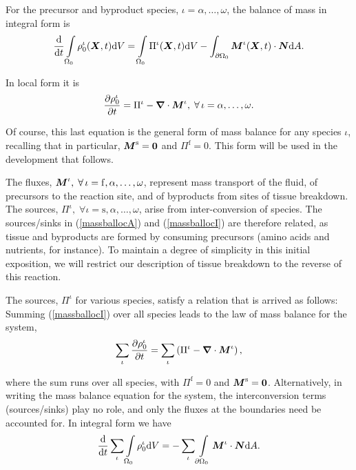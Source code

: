 For the precursor and byproduct species,
$\iota=\alpha,\dots,\omega$, the balance of mass in integral form
is
\begin{equation}
\frac{\mathrm{d}}{\mathrm{d}t} \int\limits_{\Omega_0} \rho_0^\iota
(\mbox{\boldmath$ X$},t)\mathrm{d}V = \int\limits_{\Omega_0} \Pi^\iota
(\mbox{\boldmath$ X$},t)\mathrm{d}V
-\int_{\partial\Omega_0}\mbox{\boldmath$ M$}^\iota(\mbox{\boldmath$ X$},t)\cdot\mbox{\boldmath$ N$} \mathrm{d}A.
\label{massbalintI}
\end{equation}

\noindent In local form it is
\begin{equation}
\frac{\partial\rho_0^\iota}{\partial t} = \Pi^\iota -
\mbox{\boldmath$\nabla$}\cdot\mbox{\boldmath$ M$}^\iota,\;\forall\,\iota=\alpha,\dots,\omega.
\label{massballocI}
\end{equation}

\noindent Of course, this last equation is the general form of
mass balance for any species $\iota$, recalling that in
particular, $\mbox{\boldmath$ M$}^\mathrm{s} = {\bf 0}$ and $\Pi^\mathrm{f} = 0$.
This form will be used in the development that follows.

The fluxes,
$\mbox{\boldmath$ M$}^\iota,\;\forall\,\iota=\mathrm{f},\alpha,\dots,\omega$,
represent mass transport of the fluid, of precursors to the
reaction site, and of byproducts from sites of tissue breakdown.
The sources,
$\Pi^\iota,\;\forall\iota=\mathrm{s},\alpha,\dots,\omega$, arise
from inter-conversion of species. The sources/sinks in
(\ref{massballocA}) and (\ref{massballocI}) are therefore related,
as tissue and byproducts are formed by consuming precursors (amino
acids and nutrients, for instance). To maintain a degree of
simplicity in this initial exposition, we will restrict our
description of tissue breakdown to the reverse of this reaction.

The sources, $\Pi^\iota$ for various species, satisfy a relation
that is arrived as follows: Summing (\ref{massballocI}) over all
species leads to the law of mass balance for the system,
\begin{equation}
\sum\limits_\iota\frac{\partial\rho_0^\iota}{\partial t} =
\sum\limits_\iota\left(\Pi^\iota - \mbox{\boldmath$\nabla$}\cdot\mbox{\boldmath$ M$}^\iota\right),
\label{massballocItot}
\end{equation}

\noindent where the sum runs over all species, with
$\Pi^\mathrm{f} = 0$ and $\mbox{\boldmath$ M$}^\mathrm{s} = {\bf 0}$. Alternatively,
in writing the mass balance equation for the system, the
interconversion terms (sources/sinks) play no role, and only the
fluxes at the boundaries need be accounted for. In integral form
we have
\begin{displaymath}
\frac{\mathrm{d}}{\mathrm{d}t}\sum\limits_\iota\int\limits_{\Omega_0}\rho_0^\iota
\mathrm{d}V =
-\sum\limits_\iota\int\limits_{\partial\Omega_0}\mbox{\boldmath$ M$}^\iota\cdot\mbox{\boldmath$ N$}
\mathrm{d}A.
\end{displaymath}

